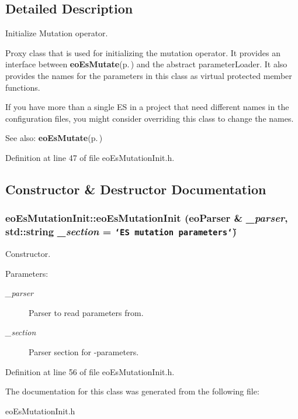 \subsection{Detailed Description}
Initialize Mutation operator. 

Proxy class that is used for initializing the mutation operator. It provides an interface between {\bf eo\-Es\-Mutate}{\rm (p.\,\pageref{classeo_es_mutate})} and the abstract parameter\-Loader. It also provides the names for the parameters in this class as virtual protected member functions.

If you have more than a single ES in a project that need different names in the configuration files, you might consider overriding this class to change the names.

\begin{Desc}
\item[See also:]{\bf eo\-Es\-Mutate}{\rm (p.\,\pageref{classeo_es_mutate})} \end{Desc}




Definition at line 47 of file eo\-Es\-Mutation\-Init.h.

\subsection{Constructor \& Destructor Documentation}
\subsubsection{\setlength{\rightskip}{0pt plus 5cm}eo\-Es\-Mutation\-Init::eo\-Es\-Mutation\-Init ({\bf eo\-Parser} \& {\em \_\-parser}, std::string {\em \_\-section} = {\tt \char`\"{}ES\ mutation\ parameters\char`\"{}})\hspace{0.3cm}{\tt  [inline]}}\label{classeo_es_mutation_init_a0}


Constructor. 

\begin{Desc}
\item[Parameters:]
\begin{description}
\item[{\em \_\-parser}]Parser to read parameters from. \item[{\em \_\-section}]Parser section for -parameters. \end{description}
\end{Desc}


Definition at line 56 of file eo\-Es\-Mutation\-Init.h.

The documentation for this class was generated from the following file:\begin{CompactItemize}
\item 
eo\-Es\-Mutation\-Init.h\end{CompactItemize}
